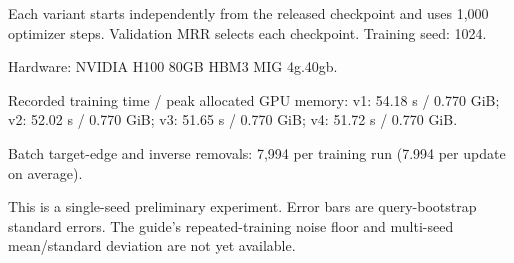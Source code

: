 Each variant starts independently from the released checkpoint and uses 1,000 optimizer steps. Validation MRR selects each checkpoint. Training seed: 1024.

Hardware: NVIDIA H100 80GB HBM3 MIG 4g.40gb.

Recorded training time / peak allocated GPU memory: v1: 54.18 s / 0.770 GiB; v2: 52.02 s / 0.770 GiB; v3: 51.65 s / 0.770 GiB; v4: 51.72 s / 0.770 GiB.

Batch target-edge and inverse removals: 7,994 per training run (7.994 per update on average).

This is a single-seed preliminary experiment. Error bars are query-bootstrap standard errors. The guide's repeated-training noise floor and multi-seed mean/standard deviation are not yet available.
